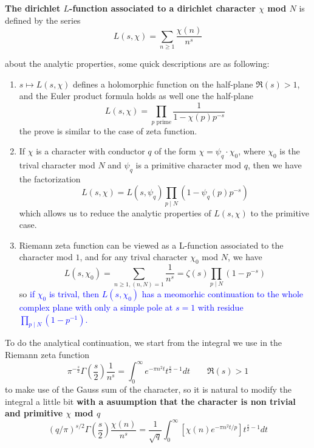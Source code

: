 \begin{definition}
    \textbf{The dirichlet \(L\)-function associated to a dirichlet character \(\chi\) mod \(N\)} is defined by the series
    \[L(s,\chi) = \sum_{n \geq 1} \frac{\chi(n)}{n^s}\]
\end{definition}

about the analytic properties, some quick descriptions are as following:
\begin{enumerate}
    \item \(s \mapsto L(s,\chi)\) defines a holomorphic function on the half-plane \(\Re(s) > 1\), and the Euler product formula holds as well one the half-plane
    \[L(s,\chi) = \prod_{p \text{ prime}} \frac{1}{1 - \chi(p)p^{-s}}\]
    the prove is similar to the case of zeta function.
    
    \item If \(\chi\) is a character with conductor \(q\) of the form \(\chi = \psi_q \cdot \chi_0 \), where \(\chi_0\) is the trival character mod \(N\) and \(\psi_q\) is a primitive character mod \(q\), then we have the factorization
    \[L(s,\chi) = L(s,\psi_q) \prod_{p \mid N} (1 - \psi_q(p)p^{-s})\]
     which allows us to reduce the analytic properties of \(L(s,\chi)\) to the primitive case.

    \item Riemann zeta function can be viewed as a L-function associated to the character mod \(1\), and for any trival character \(\chi_0\) mod \(N\), we have
    \[L(s,\chi_0) = \sum_{n \geq 1, (n,N) =1} \frac{1}{n^s} = \zeta(s) \prod_{p \mid N} (1 - p^{-s})\]
    so \textcolor{blue}{if \(\chi_0\) is trival, then \(L(s,\chi_0)\) has a meomorhic continuation to the whole complex plane with only a simple pole at \(s = 1\) with residue \(\prod_{p \mid N} (1 - p^{-1})\).}
\end{enumerate}

To do the analytical continuation, we start from the integral we use in the Riemann zeta function
\[\pi^{-\frac{s}{2}}\Gamma(\frac{s}{2})\frac{1}{n^s} = \int_{0}^{\infty}e^{-\pi n^2t}t^{\frac{s}{2}-1} dt \qquad \Re(s)>1\]
to make use of the Gauss sum of the character, so it is natural to modify the integral a little bit \textbf{with a asuumption that the character is non trivial and primitive \(\chi\) mod \(q\)}
\begin{equation} \label{integralrepofdirichletL}
    (q/\pi)^{s/2}\Gamma(\frac{s}{2})\frac{\chi(n)}{n^s} = \frac{1}{\sqrt{q}}\int_{0}^{\infty} [\chi(n)e^{-\pi n^2t/p}]t^{\frac{s}{2}-1}dt
\end{equation}

